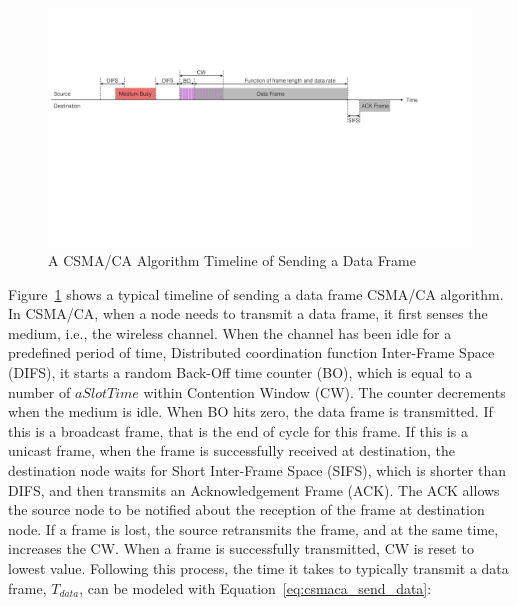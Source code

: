 \documentclass[12pt]{report}
\begin{document}
\begin{figure}[h]
  \begin{center}
    \includegraphics[width=\textwidth]{figures/csmaca.pdf}
    \caption{\label{fig:csmaca}A CSMA/CA Algorithm Timeline of Sending a Data Frame}
  \end{center}
\end{figure}

Figure~\ref{fig:csmaca} shows a typical timeline of sending a data frame CSMA/CA algorithm. In CSMA/CA, when a node needs to transmit a data frame, it first senses the medium, i.e., the wireless channel. When the channel has been idle for a predefined period of time, Distributed coordination function Inter-Frame Space (DIFS), it starts a random Back-Off time counter (BO), which is equal to a number of $aSlotTime$ within Contention Window (CW). The counter decrements when the medium is idle. When BO hits zero, the data frame is transmitted. If this is a broadcast frame, that is the end of cycle for this frame. If this is a unicast frame, when the frame is successfully received at destination, the destination node waits for Short Inter-Frame Space (SIFS), which is shorter than DIFS, and then transmits an Acknowledgement Frame (ACK). The ACK allows the source node to be notified about the reception of the frame at destination node. If a frame is lost, the source retransmits the frame, and at the same time, increases the CW. When a frame is successfully transmitted, CW is reset to lowest value. Following this process, the time it takes to typically transmit a data frame, $T_{data}$, can be modeled with Equation~\ref{eq:csmaca_send_data}:
\end{document}
